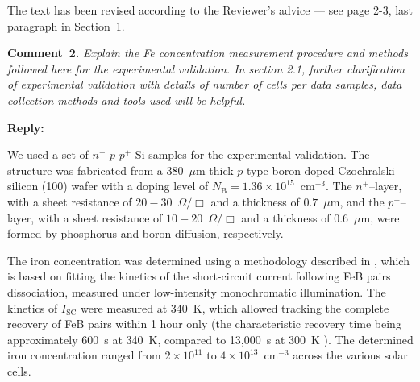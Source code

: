 \documentclass[a4paper,fleqn]{cas-sc}
\begin{document}
The text has been revised according to the Reviewer's advice --- see page 2-3, last paragraph in Section~1.





\vspace{1cm}
\noindent
\textcolor[rgb]{0.00,0.50,1.00}{\textbf{Comment~2.}}
\emph{Explain the Fe concentration measurement procedure and methods followed here for the experimental validation.
In section 2.1, further clarification of experimental validation with details of number of cells per data samples, data collection methods and tools used will be helpful.}

\noindent
\textcolor[rgb]{0.51,0.00,0.00}{\textbf{Reply:}}

We used a set of $n^+$-$p$-$p^+$-Si samples for the experimental validation.
The structure was fabricated from a 380~$\mu$m thick $p$-type boron-doped Czochralski silicon (100) wafer
with a doping level of $N_\mathrm{B}=1.36\times10^{15}$~cm$^{-3}$.
The $n^+$--layer, with a sheet resistance of $20-30$~$\Omega/\Box$ and a thickness of $0.7$~$\mu$m, 
and the $p^+$--layer, with a sheet resistance of $10-20$~$\Omega/\Box$ and a thickness of $0.6$~$\mu$m, 
were formed by phosphorus and boron diffusion, respectively. 

The iron concentration was determined using a methodology described in \cite{Olikh2022:JMatSci,Olikh2021JAP}, 
which is based on fitting the kinetics of the short-circuit current following FeB pairs dissociation, 
measured under low-intensity monochromatic illumination.
The kinetics of $I_\mathrm{SC}$ were measured at 340~K, which allowed tracking the complete recovery of FeB pairs within 1 hour only 
(the characteristic recovery time being approximately 600~s at 340~K, compared to 13,000~s at 300~K \cite{FeBAssJAP2014,FeBKin2019}).
The determined iron concentration ranged from $2\times10^{11}$ to $4\times10^{13}$~cm$^{-3}$ across the various solar cells.
\end{document}
